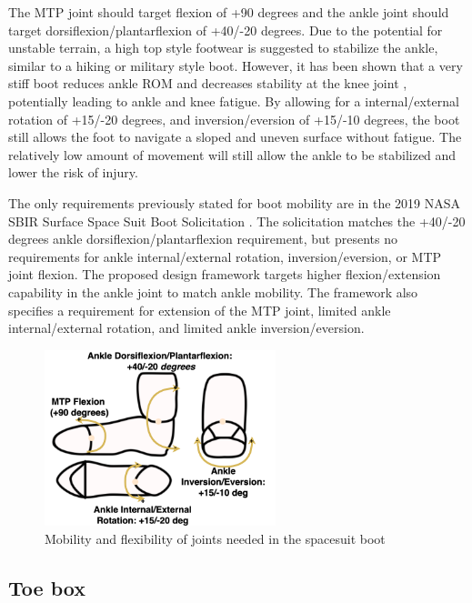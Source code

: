 \documentclass[defaultstyle,11pt]{thesis}
\begin{document}
The MTP joint should target flexion of +90 degrees and the ankle joint should target dorsiflexion/plantarflexion of +40/-20 degrees.
Due to the potential for unstable terrain, a high top style footwear is suggested to stabilize the ankle, similar to a hiking or military style boot.
However, it has been shown that a very stiff boot reduces ankle ROM and decreases stability at the knee joint \citep{Bohm2010}, potentially leading to ankle and knee fatigue.
By allowing for a internal/external rotation of +15/-20 degrees, and inversion/eversion of +15/-10 degrees, the boot still allows the foot to navigate a sloped and uneven surface without fatigue.
The relatively low amount of movement will still allow the ankle to be stabilized and lower the risk of injury.

The only requirements previously stated for boot mobility are in the 2019 NASA SBIR Surface Space Suit Boot Solicitation \citep{NASA2019}.
The solicitation matches the +40/-20 degrees ankle dorsiflexion/plantarflexion requirement, but presents no requirements for ankle internal/external rotation, inversion/eversion, or MTP joint flexion.
The proposed design framework targets higher flexion/extension capability in the ankle joint to match ankle mobility.
The framework also specifies a requirement for extension of the MTP joint, limited ankle internal/external rotation, and limited ankle inversion/eversion.

\begin{figure}
\hypertarget{fig:SA3-Mobility}{%
\centering
\includegraphics[width=0.6\textwidth,height=\textheight]{../fig/SA3/Mobility.png}
\caption{Mobility and flexibility of joints needed in the spacesuit boot}\label{fig:SA3-Mobility}
}
\end{figure}

\hypertarget{toe-box}{%
\subsection{Toe box}\label{toe-box}}
\end{document}
